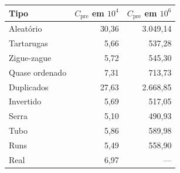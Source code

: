 \begin{tabular}{lrr}
\hline
\textbf{Tipo} & \textbf{$C_{\text{pre}}$ em $10^4$} & \textbf{$C_{\text{pre}}$ em $10^6$} \\
\hline
Aleatório & 30{,}36 & 3.049{,}14 \\
Tartarugas & 5{,}66 & 537{,}28 \\
Zigue-zague & 5{,}72 & 545{,}30 \\
Quase ordenado & 7{,}31 & 713{,}73 \\
Duplicados & 27{,}63 & 2.668{,}85 \\
Invertido & 5{,}69 & 517{,}05 \\
Serra & 5{,}10 & 490{,}93 \\
Tubo & 5{,}86 & 589{,}98 \\
Runs & 5{,}49 & 558{,}90 \\
Real & 6{,}97 & {---} \\
\hline
\end{tabular}
